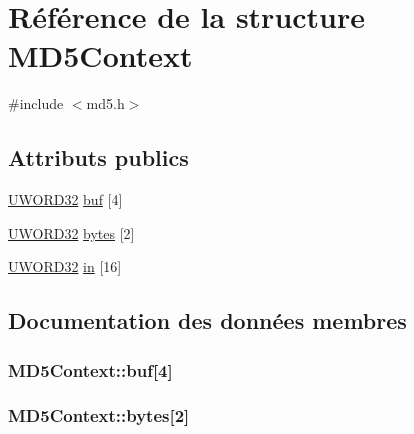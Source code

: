 \hypertarget{struct_m_d5_context}{}\section{Référence de la structure M\+D5\+Context}
\label{struct_m_d5_context}


{\ttfamily \#include $<$md5.\+h$>$}

\subsection*{Attributs publics}
\begin{DoxyCompactItemize}
\item 
\hyperlink{md5__loc_8h_a75d002c75b48928a52514996f264a1a5}{U\+W\+O\+R\+D32} \hyperlink{struct_m_d5_context_ab50609f4b1d5f31af6d1045957aabe91}{buf} \mbox{[}4\mbox{]}
\item 
\hyperlink{md5__loc_8h_a75d002c75b48928a52514996f264a1a5}{U\+W\+O\+R\+D32} \hyperlink{struct_m_d5_context_a51a39f313507eff8f5ef823d75035d41}{bytes} \mbox{[}2\mbox{]}
\item 
\hyperlink{md5__loc_8h_a75d002c75b48928a52514996f264a1a5}{U\+W\+O\+R\+D32} \hyperlink{struct_m_d5_context_ac2d5f8af04d15c256eecb635bdaf52c3}{in} \mbox{[}16\mbox{]}
\end{DoxyCompactItemize}


\subsection{Documentation des données membres}
\hypertarget{struct_m_d5_context_ab50609f4b1d5f31af6d1045957aabe91}{}
\subsubsection[{buf}]{ M\+D5\+Context\+::buf\mbox{[}4\mbox{]}}\label{struct_m_d5_context_ab50609f4b1d5f31af6d1045957aabe91}
\hypertarget{struct_m_d5_context_a51a39f313507eff8f5ef823d75035d41}{}
\subsubsection[{bytes}]{ M\+D5\+Context\+::bytes\mbox{[}2\mbox{]}}\label{struct_m_d5_context_a51a39f313507eff8f5ef823d75035d41}
\hypertarget{struct_m_d5_context_ac2d5f8af04d15c256eecb635bdaf52c3}{}
